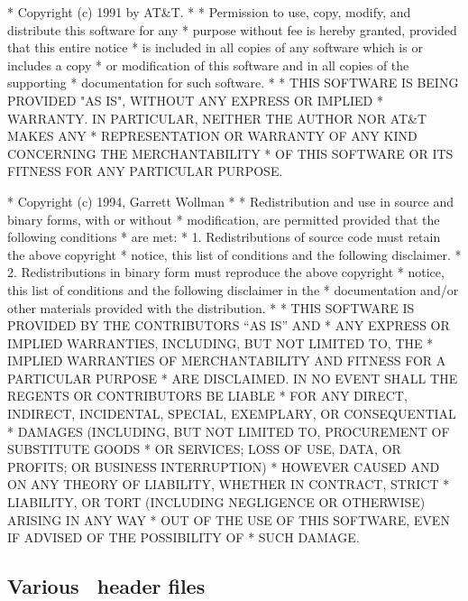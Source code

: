 \begin{copyrightEnv}
 * Copyright (c) 1991 by AT&T.
 *
 * Permission to use, copy, modify, and distribute this software for any
 * purpose without fee is hereby granted, provided that this entire notice
 * is included in all copies of any software which is or includes a copy
 * or modification of this software and in all copies of the supporting
 * documentation for such software.
 *
 * THIS SOFTWARE IS BEING PROVIDED "AS IS", WITHOUT ANY EXPRESS OR IMPLIED
 * WARRANTY.  IN PARTICULAR, NEITHER THE AUTHOR NOR AT&T MAKES ANY
 * REPRESENTATION OR WARRANTY OF ANY KIND CONCERNING THE MERCHANTABILITY
 * OF THIS SOFTWARE OR ITS FITNESS FOR ANY PARTICULAR PURPOSE.
\end{copyrightEnv}

\begin{copyrightEnv}
 * Copyright (c) 1994, Garrett Wollman
 *
 * Redistribution and use in source and binary forms, with or without
 * modification, are permitted provided that the following conditions
 * are met:
 * 1. Redistributions of source code must retain the above copyright
 *    notice, this list of conditions and the following disclaimer.
 * 2. Redistributions in binary form must reproduce the above copyright
 *    notice, this list of conditions and the following disclaimer in the
 *    documentation and/or other materials provided with the distribution.
 *
 * THIS SOFTWARE IS PROVIDED BY THE CONTRIBUTORS ``AS IS'' AND
 * ANY EXPRESS OR IMPLIED WARRANTIES, INCLUDING, BUT NOT LIMITED TO, THE
 * IMPLIED WARRANTIES OF MERCHANTABILITY AND FITNESS FOR A PARTICULAR PURPOSE
 * ARE DISCLAIMED.  IN NO EVENT SHALL THE REGENTS OR CONTRIBUTORS BE LIABLE
 * FOR ANY DIRECT, INDIRECT, INCIDENTAL, SPECIAL, EXEMPLARY, OR CONSEQUENTIAL
 * DAMAGES (INCLUDING, BUT NOT LIMITED TO, PROCUREMENT OF SUBSTITUTE GOODS
 * OR SERVICES; LOSS OF USE, DATA, OR PROFITS; OR BUSINESS INTERRUPTION)
 * HOWEVER CAUSED AND ON ANY THEORY OF LIABILITY, WHETHER IN CONTRACT, STRICT
 * LIABILITY, OR TORT (INCLUDING NEGLIGENCE OR OTHERWISE) ARISING IN ANY WAY
 * OUT OF THE USE OF THIS SOFTWARE, EVEN IF ADVISED OF THE POSSIBILITY OF
 * SUCH DAMAGE.
\end{copyrightEnv}

\subsection{Various \oskit\ header files}

